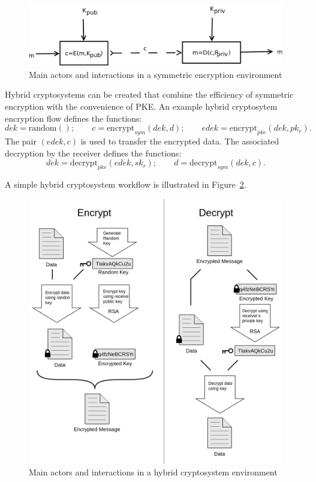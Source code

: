 \documentclass[notitlepage,longbibliography]{revtex4-1}
\begin{document}
\begin{figure}
\centering
\includegraphics[width=\columnwidth]{pke.png}
\caption{Main actors and interactions in a symmetric encryption environment}\label{fig-pke}
\end{figure}

Hybrid cryptosystems can be created that combine the efficiency of symmetric encryption with the convenience of PKE.
An example hybrid cryptosytem encryption flow defines the functions:
$$dek = \text{random}();\qquad c = \text{encrypt}_{sym}(dek, d);\qquad edek=\text{encrypt}_{pke}(dek, pk_r).$$
The pair $(edek, c)$ is used to transfer the encrypted data.
The associated decryption by the receiver defines the functions:
$$dek=\text{decrypt}_{pke}(edek, sk_r);\qquad d = \text{decrypt}_{sym}(dek, c).$$

A simple hybrid cryptosystem workflow is illustrated in Figure~\ref{fig-hybrid}.

\begin{figure}
\centering
\includegraphics[width=\columnwidth]{hybrid.png}
\caption{Main actors and interactions in a hybrid cryptosystem environment}\label{fig-hybrid}
\end{figure}
\end{document}
